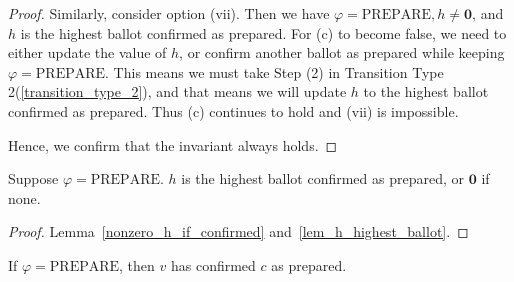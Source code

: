\begin{proof}
    Similarly, consider option (vii).
    Then we have $\varphi = \text{PREPARE}, h \ne \textbf{0}$, and $h$ is the highest ballot confirmed as prepared.
    For (c) to become false, we need to either update the value of $h$, or confirm another ballot as prepared while keeping $\varphi = \text{PREPARE}$.
    This means we must take Step (2) in Transition Type 2(\ref{transition_type_2}), and that means we will update $h$ to the highest ballot confirmed as prepared.
    Thus (c) continues to hold and (vii) is impossible.

    Hence, we confirm that the invariant always holds.
\end{proof}

\begin{thm}\label{h_highest_ballot_confirmed_prepared}
    Suppose $\varphi = \text{PREPARE}$.
    $h$ is the highest ballot confirmed as prepared, or $\textbf{0}$ if none.
\end{thm}

\begin{proof}
    Lemma~\ref{nonzero_h_if_confirmed} and~\ref{lem_h_highest_ballot}.
\end{proof}


\begin{lem}
    If $\varphi = \text{PREPARE}$, then $v$ has confirmed $c$ as prepared.
\end{lem}

